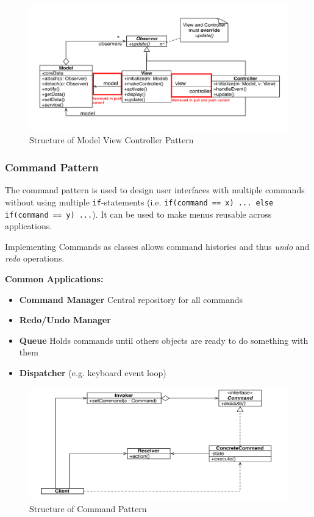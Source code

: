 \begin{figure}[h]
	\centering
	\includegraphics[width=\linewidth]{images/pattern_mvc.png}
	\caption{Structure of Model View Controller Pattern}
\end{figure}

\newpage

\subsubsection{Command Pattern}
The command pattern is used to design user interfaces with multiple commands without using multiple \texttt{if}-statements (i.e. \texttt{if(command == x) {...} else if(command == y) ...}).
It can be used to make menus reusable across applications.\newline

Implementing Commands as classes allows command histories and thus \textit{undo} and \textit{redo} operations.\newline

\textbf{Common Applications:}
\begin{itemize}[topsep=5pt, itemsep=0pt]
  \item \textbf{Command Manager} Central repository for all commands
  \item \textbf{Redo/Undo Manager}
  \item \textbf{Queue} Holds commands until others objects are ready to do something with them
  \item \textbf{Dispatcher} (e.g. keyboard event loop)
\end{itemize}

\begin{figure}[h]
	\centering
	\includegraphics[width=\linewidth]{images/pattern_command.png}
	\caption{Structure of Command Pattern}
\end{figure}
\newpage


